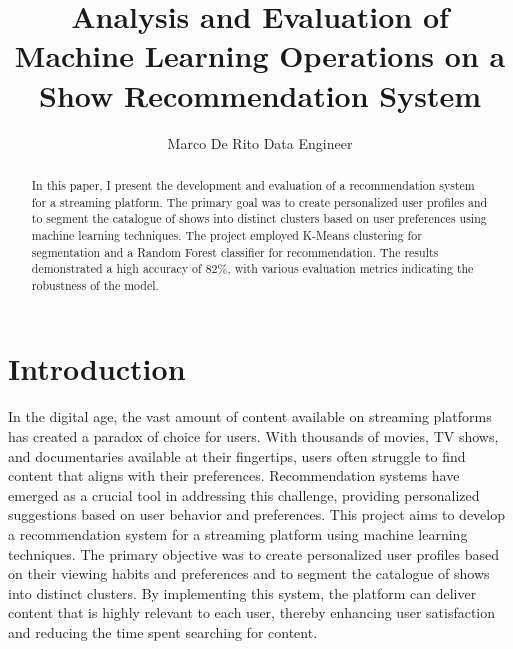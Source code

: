 \documentclass[sigconf]{acmart}
\begin{document}
	\title{Analysis and Evaluation of Machine Learning Operations on a Show Recommendation System}
	\author{Marco De Rito
		Data Engineer}
	\begin{abstract}
		In this paper, I present the development and evaluation of a recommendation system for a streaming platform. The primary goal was to create personalized user profiles and to segment the catalogue of shows into distinct clusters based on user preferences using machine learning techniques. The project employed K-Means clustering for segmentation and a Random Forest classifier for recommendation. The results demonstrated a high accuracy of 82\%, with various evaluation metrics indicating the robustness of the model.
	\end{abstract}
	\maketitle
	\section{Introduction}
	In the digital age, the vast amount of content available on streaming platforms has created a paradox of choice for users. With thousands of movies, TV shows, and documentaries available at their fingertips, users often struggle to find content that aligns with their preferences. Recommendation systems have emerged as a crucial tool in addressing this challenge, providing personalized suggestions based on user behavior and preferences. This project aims to develop a recommendation system for a streaming platform using machine learning techniques. The primary objective was to create personalized user profiles based on their viewing habits and preferences and to segment the catalogue of shows into distinct clusters. By implementing this system, the platform can deliver content that is highly relevant to each user, thereby enhancing user satisfaction and reducing the time spent searching for content.
\end{document}
